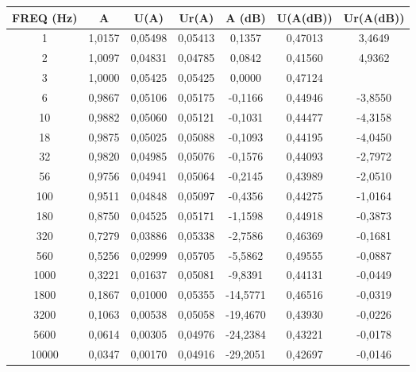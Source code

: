 \begin{table}[!ht]
    \centering
    \begin{tabular}{|c|c|c|c|c|c|c|}
    \hline
        \textbf{FREQ (Hz)} & \textbf{A} & \textbf{U(A)} & \textbf{Ur(A)} & \textbf{A (dB)} & \textbf{U(A(dB))} & \textbf{Ur(A(dB))} \\ \hline
        1 & 1,0157 & 0,05498 & 0,05413 & 0,1357 & 0,47013 & 3,4649 \\ \hline
        2 & 1,0097 & 0,04831 & 0,04785 & 0,0842 & 0,41560 & 4,9362 \\ \hline
        3 & 1,0000 & 0,05425 & 0,05425 & 0,0000 & 0,47124 & ~ \\ \hline
        6 & 0,9867 & 0,05106 & 0,05175 & -0,1166 & 0,44946 & -3,8550 \\ \hline
        10 & 0,9882 & 0,05060 & 0,05121 & -0,1031 & 0,44477 & -4,3158 \\ \hline
        18 & 0,9875 & 0,05025 & 0,05088 & -0,1093 & 0,44195 & -4,0450 \\ \hline
        32 & 0,9820 & 0,04985 & 0,05076 & -0,1576 & 0,44093 & -2,7972 \\ \hline
        56 & 0,9756 & 0,04941 & 0,05064 & -0,2145 & 0,43989 & -2,0510 \\ \hline
        100 & 0,9511 & 0,04848 & 0,05097 & -0,4356 & 0,44275 & -1,0164 \\ \hline
        180 & 0,8750 & 0,04525 & 0,05171 & -1,1598 & 0,44918 & -0,3873 \\ \hline
        320 & 0,7279 & 0,03886 & 0,05338 & -2,7586 & 0,46369 & -0,1681 \\ \hline
        560 & 0,5256 & 0,02999 & 0,05705 & -5,5862 & 0,49555 & -0,0887 \\ \hline
        1000 & 0,3221 & 0,01637 & 0,05081 & -9,8391 & 0,44131 & -0,0449 \\ \hline
        1800 & 0,1867 & 0,01000 & 0,05355 & -14,5771 & 0,46516 & -0,0319 \\ \hline
        3200 & 0,1063 & 0,00538 & 0,05058 & -19,4670 & 0,43930 & -0,0226 \\ \hline
        5600 & 0,0614 & 0,00305 & 0,04976 & -24,2384 & 0,43221 & -0,0178 \\ \hline
        10000 & 0,0347 & 0,00170 & 0,04916 & -29,2051 & 0,42697 & -0,0146 \\ \hline
    \end{tabular}
\end{table}

\FloatBarrier
\clearpage


